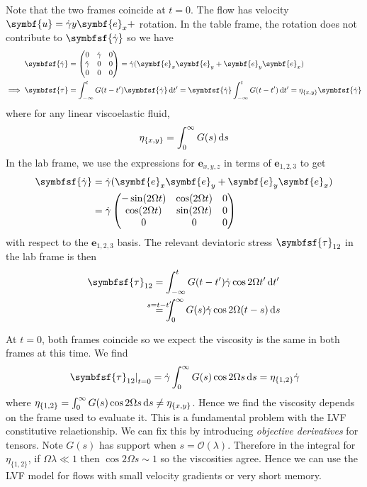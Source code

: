 \documentclass{jknotes}
\begin{document}
Note that the two frames coincide at $t=0$. The flow has velocity $\symbf{u} =
\srate y \symbf{e}_x +$ rotation. In the table frame, the rotation does not
contribute to $\symbfsf{\srate}$ so we have
\begin{align}
	\symbfsf{\srate} &= \begin{pmatrix} 0 & \srate & 0 \\ \srate & 0 & 0 \\ 0 &
	0 & 0 \end{pmatrix} = \srate (\symbf{e}_x\symbf{e}_y +
	\symbf{e}_y\symbf{e}_x) \\
	\implies \symbfsf{\tau} &= \int_{-\infty}^t G(t-t') \symbfsf{\srate} \,
	\diffd t' = \symbfsf{\srate} \int_{-\infty}^t G(t-t')\,\diffd t' =
	\eta_{\{x,y\}} \symbfsf{\srate}
\end{align}
where for any linear viscoelastic fluid,
\begin{equation}
	\eta_{\{x,y\}} = \int_0^\infty G(s) \, \diffd s
\end{equation}
In the lab frame, we use the expressions for $\symbf{e}_{x,y,z}$ in terms of
$\symbf{e}_{1,2,3}$ to get
\begin{align}
	\symbfsf{\srate} &= \srate (\symbf{e}_x\symbf{e}_y +
	\symbf{e}_y\symbf{e}_x) \\
	&= \srate \begin{pmatrix} -\sin(2\Omega t) & \cos(2\Omega t) & 0 \\
\cos(2\Omega t) & \sin(2\Omega t) & 0 \\ 0 & 0 & 0 \end{pmatrix}
\end{align}
with respect to the $\symbf{e}_{1,2,3}$ basis. The relevant deviatoric stress
$\symbfsf{\tau}_{12}$ in the lab frame is then
\begin{align}
	\symbfsf{\tau}_{12} &= \int_{-\infty}^t G(t-t') \srate \cos 2 \Omega t' \,
	\diffd t' \\
	&\stackrel{\mathmakebox[\widthof{=}]{s=t-t'}}{=} \int_0^\infty G(s) \srate
	\cos 2 \Omega (t-s) \, \diffd s
\end{align}

At $t=0$, both frames coincide so we expect the viscosity is the same in both
frames at this time. We find
\begin{equation}
	\left.\symbfsf{\tau}_{12}\right|_{t=0} = \srate \int_0^\infty G(s) \cos 2
		\Omega s \, \diffd s = \eta_{\{1,2\}}\srate
\end{equation}
where $\eta_{\{1,2\}} = \int_0^\infty G(s)\cos 2\Omega s \, \diffd s \ne
\eta_{\{x,y\}}$. Hence we find the viscosity depends on the frame used to
evaluate it. This is a fundamental problem with the LVF constitutive
relaetionship. We can fix this by introducing \emph{objective derivatives} for
tensors.  Note $G(s)$ has support when $s = \mathcal{O}(\lambda)$. Therefore
in the integral for $\eta_{\{1,2\}}$, if $\Omega \lambda \ll 1$ then $\cos 2
\Omega s \sim 1$ so the viscosities agree. Hence we can use the LVF model for
flows with small velocity gradients or very short memory.
\end{document}
